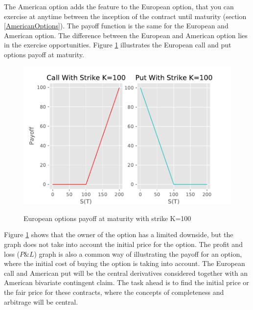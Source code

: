The American option adds the feature to the European option, that you can exercise at anytime between the inception of the contract until maturity (section \ref{AmericanOptions}). The payoff function is the same for the European and American option. The difference between the European and American option lies in the exercise opportunities. Figure \ref{fig:contractfct} illustrates the European call and put options payoff at maturity. 

\begin{figure}[H]
\centering
\includegraphics{Figures/contractfct.pdf}\\
\decoRule
\caption[Contract Functions]{European options payoff at maturity with strike K=100}
\label{fig:contractfct}
\end{figure}

Figure \ref{fig:contractfct} shows that the owner of the option has a limited downside, but the graph does not take into account the initial price for the option. The profit and loss ($P\& L$) graph is also a common way of illustrating the payoff for an option, where the initial cost of buying the option is taking into account. The European call and American put will be the central derivatives considered together with an American bivariate contingent claim. The task ahead is to find the initial price or the fair price for these contracts, where the concepts of completeness and arbitrage will be central.


